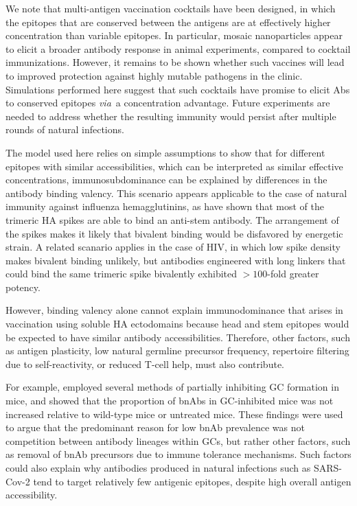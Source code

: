 \documentclass[utf8]{frontiersHLTH}%
\newcommand{\cred}[1]{#1} %
\def\via {{\it via}}
\begin{document}
\cred{We note that multi-antigen vaccination cocktails have been designed, in
which the epitopes that are conserved between the antigens are at
effectively higher concentration than variable
epitopes.\cite{kanekiyo19,cohen21,glanville20} In particular, mosaic
nanoparticles appear to elicit a broader antibody response in animal
experiments, compared to cocktail immunizations.\cite{kanekiyo19,cohen21}
However, it remains to be shown whether such vaccines will lead to
improved protection against highly mutable pathogens in the clinic.}
%
Simulations performed here suggest that such cocktails have promise to
elicit Abs to conserved epitopes \via~a concentration advantage.  Future
experiments are needed to address whether the resulting immunity would
persist after multiple rounds of natural infections.

\cred{The model used here relies on simple assumptions to show that for different
epitopes with similar accessibilities, which can be interpreted as
similar effective concentrations, immunosubdominance can be explained by
differences in the antibody binding valency. This scenario appears
applicable to the case of  natural immunity against influenza
hemagglutinins, as \citet{harris13} have shown that most of the trimeric
HA spikes are able to bind an anti-stem antibody. The arrangement of the
spikes makes it likely that bivalent binding would be disfavored by energetic
strain.\cite{harris13,amitai20} A related scanario applies in the
case of HIV, in which low spike density makes bivalent binding unlikely,
but antibodies engineered with long linkers  that could bind the same
trimeric spike bivalently exhibited $>100$-fold greater potency.\cite{galimidi15}
}
%
\cred{
However, binding valency alone cannot explain immunodominance 
that arises in vaccination using soluble HA ectodomains because
head and stem epitopes would be expected to have similar antibody accessibilities.
Therefore, other factors, such as antigen plasticity, low natural germline
precursor frequency, repertoire filtering due to self-reactivity, or
reduced T-cell help,\cite{erwin20} must also contribute.
}
%
\cred{For example, \citet{keating20} employed several methods of partially inhibiting GC
formation in mice, and showed that the proportion of bnAbs in GC-inhibited
mice was not increased relative to wild-type mice or untreated mice. These
findings were used to argue that the predominant reason for low bnAb
prevalence was not competition between antibody lineages within GCs, but rather other
factors, such as removal of bnAb precursors due to immune tolerance
mechanisms.\cite{keating20} Such factors could also explain
why antibodies produced in natural infections such as SARS-Cov-2 tend to target relatively
few antigenic epitopes, despite high overall antigen accessibility.\cite{barnes20}}
\end{document}
